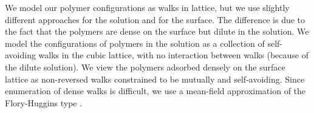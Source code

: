\documentclass[journal=mamobx,manuscript=article]{achemso}
\begin{document}

%



We model our polymer configurations as walks in lattice, but we use slightly different approaches for the solution and for the surface.
The difference is due to the fact that the polymers are dense on the surface but 
dilute in the solution.  We model the configurations of polymers in the solution as a collection of 
self-avoiding walks in the cubic lattice, with no interaction between walks (because of the dilute solution).
We view the polymers adsorbed densely on the surface lattice as non-reversed walks constrained to
be mutually and self-avoiding.  Since enumeration of
dense walks is difficult, we use a mean-field 
approximation of the Flory-Huggins type \cite{Flory1953}.
\end{document}
